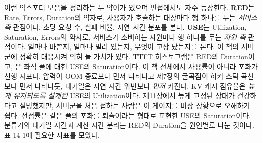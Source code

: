 이런 익스포터 모음을 정리하는 두 약어가 있으며 면접에서도 자주 등장한다. \textbf{RED}는 Rate, Errors, Duration의 약자로, 사용자가 호출하는 대상마다 행 하나를 두는 \textit{서비스 측} 관점이다. 초당 요청 수, 실패 비율, 지연 시간 분포를 본다. \textbf{USE}는 Utilization, Saturation, Errors의 약자로, 서비스가 소비하는 자원마다 행 하나를 두는 \textit{자원 측} 관점이다. 얼마나 바쁜지, 얼마나 밀려 있는지, 무엇이 고장 났는지를 본다. 이 책의 서버군에 정확히 대응시켜 익혀 둘 가치가 있다. TTFT 히스토그램은 RED의 Duration이고, 은 좌석 풀에 대한 USE의 Saturation이다. 이 책 전체에서 사용률이 아니라 포화가 선행 지표다.  압력이 OOM 종료보다 먼저 나타나고 제7장의 굴곡점이 하키 스틱 곡선보다 먼저 나타나듯, 대기열은 지연 시간 위반보다 \textit{먼저} 커진다. KV 캐시 점유율은 \textit{높게 유지되도록 설계된} USE의 Utilization이다. 제11장에서 높게 고정된 상태가 건강하다고 설명했지만, 서버군을 처음 접하는 사람은 이 게이지를 비상 상황으로 오해하기 쉽다. 선점률은 같은 풀의 포화를 퇴출이라는 형태로 표현한 USE의 Saturation이다. 분류기의 대기열 시간과 계산 시간 분리는 RED의 Duration을 원인별로 나눈 것이다. 표 14-1에 필요한 지표를 모았다.

